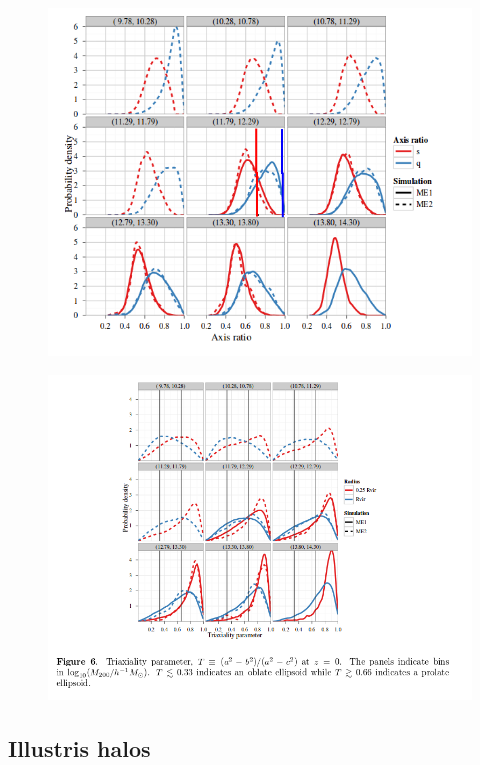 \documentclass[12pt]{article}
\begin{document}
\begin{figure}[H]
\centering
\includegraphics[scale=0.5]{distribution.png}
\end{figure}

\begin{figure}[H]
\centering
\includegraphics[scale=0.5]{triaxial.png}
\end{figure}


\subsection{Illustris halos}
\end{document}
